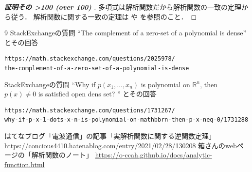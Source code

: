 \documentclass[leqno, a4paper, 12pt]{jsarticle}
\newcommand{\rr}{\mathbb{R}}
\newcounter{mycnt}%
\newcommand{\outcnt}{%
  \the\value{mycnt}%
  \ifnum\value{mycnt}>100 (over 100)\fi%
  \stepcounter{mycnt}%
}
\begin{document}
\begin{proof}[\textbf{証明その\outcnt}]
多項式は解析関数だから解析関数の一致の定理から従う．
解析関数に関する一致の定理は
\cite{self}や\cite{hako}
を参照のこと．
\end{proof}













	
\begin{thebibliography}{9}
StackExchangeの質問
``The complement of a zero-set of a polynomial is dense'' 
とその回答
\begin{verbatim}
https://math.stackexchange.com/questions/2025978/
the-complement-of-a-zero-set-of-a-polynomial-is-dense
\end{verbatim}

StackExchangeの質問
``Why if $p(x_{1}, \dots, x_{n})$ is 
polynomial on $\rr^{n}$, 
then $p(x)\neq 0$ is satisfied open dens set?
'' 
とその回答

\begin{verbatim}
https://math.stackexchange.com/questions/1731267/
why-if-p-x-1-dots-x-n-is-polynomial-on-mathbbrn-then-p-x-neq-0/1731288
\end{verbatim}

はてなブログ「電波通信」の記事「実解析関数に関する逆関数定理」
\url{
https://concious4410.hatenablog.com/entry/2021/02/28/130208}
箱さんのwebページの「解析関数のノート」
\url{https://o-ccah.github.io/docs/analytic-function.html}

\end{thebibliography}




			
\end{document}
